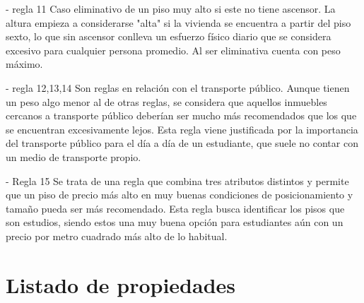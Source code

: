 \documentclass[12pt]{report} %
\begin{document}
    - regla 11
    Caso eliminativo de un piso muy alto si este no tiene ascensor. La altura empieza a 
    considerarse "alta" si la vivienda se encuentra a partir del piso sexto, lo que sin ascensor 
    conlleva un esfuerzo físico diario que se considera excesivo para cualquier persona promedio. 
    Al ser eliminativa cuenta con peso máximo.

    - regla 12,13,14
    Son reglas en relación con el transporte público. Aunque tienen un peso algo menor al de otras
    reglas, se considera que aquellos inmuebles cercanos a transporte público deberían ser mucho 
    más recomendados que los que se encuentran excesivamente lejos. Esta regla viene justificada
    por la importancia del transporte público para el día a día de un estudiante, que suele no contar 
    con un medio de transporte propio.

    - Regla 15
    Se trata de una regla que combina tres atributos distintos y permite que un piso de precio más 
    alto en muy buenas condiciones de posicionamiento y tamaño pueda ser más recomendado. Esta regla busca 
    identificar los pisos que son estudios, siendo estos una muy buena opción para estudiantes aún con 
    un precio por metro cuadrado más alto de lo habitual. 

    \chapter{Listado de propiedades}
    \label{chap:propiedades}
\end{document}
